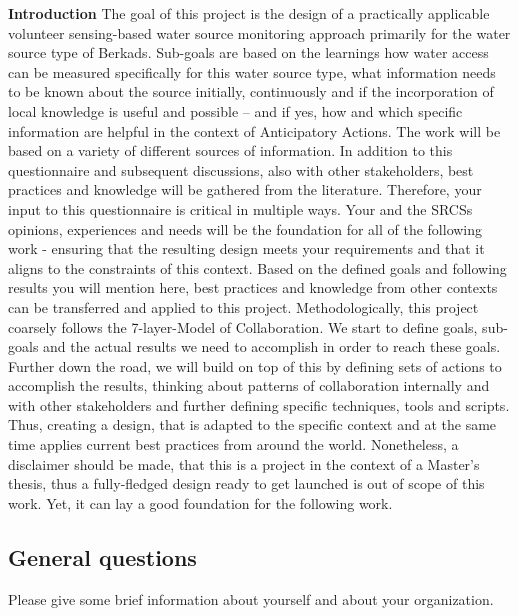 \textbf{Introduction}\newline
The goal of this project is the design of a practically applicable volunteer sensing-based water source monitoring approach primarily for the water source type of Berkads.
Sub-goals are based on the learnings how water access can be measured specifically for this water source type, what information needs to be known about the source initially, continuously and if the incorporation of local knowledge is useful and possible -- and if yes, how and which specific information are helpful in the context of Anticipatory Actions.\newline
The work will be based on a variety of different sources of information. In addition to this questionnaire and subsequent discussions, also with other stakeholders, best practices and knowledge will be gathered from the literature. Therefore, your input to this questionnaire is critical in multiple ways. Your and the SRCSs opinions, experiences and needs will be the foundation for all of the following work - ensuring that the resulting design meets your requirements and that it aligns to the constraints of this context. Based on the defined goals and following results you will mention here, best practices and knowledge from other contexts can be transferred and applied to this project.\newline
Methodologically, this project coarsely follows the 7-layer-Model of Collaboration. We start to define goals, sub-goals and the actual results we need to accomplish in order to reach these goals. Further down the road, we will build on top of this by defining sets of actions to accomplish the results, thinking about patterns of collaboration internally and with other stakeholders and further defining specific techniques, tools and scripts. Thus, creating a design, that is adapted to the specific context and at the same time applies current best practices from around the world. Nonetheless, a disclaimer should be made, that this is a project in the context of a Master's thesis, thus a fully-fledged design ready to get launched is out of scope of this work. Yet, it can lay a good foundation for the following work.

\subsection*{General questions}\newline
Please give some brief information about yourself and about your organization.

